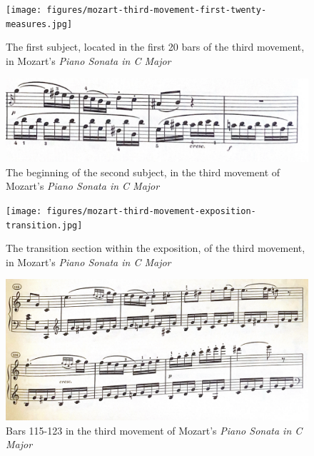 \begin{figure}
  	\centering
  	\texttt{[image: figures/mozart-third-movement-first-twenty-measures.jpg]}
  	\caption[The first subject of the third movement, in Mozart's \textit{Piano Sonata in C Major}]{The first subject, located in the first 20 bars of the third movement, in Mozart's \textit{Piano Sonata in C Major}}
 	\label{fig:mozart-third-movement-first-twenty-measures}
\end{figure}

\begin{figure}
	\centering
	\includegraphics[width=\textwidth]{figures/mozart-third-movement-beginning-of-second-subject-exposition.jpg}
	\caption[Subject number two, in the third movement of Mozart's \textit{Piano Sonata in C Major}]{The beginning of the second subject, in the third movement of Mozart's \textit{Piano Sonata in C Major}}
	\label{fig:mozart-third-movement-beginning-of-second-subject-exposition}
\end{figure}



\begin{figure}
  	\centering
  	\texttt{[image: figures/mozart-third-movement-exposition-transition.jpg]}
  	\caption{The transition section within the exposition, of the third movement, in Mozart's \textit{Piano Sonata in C Major}}
  	\label{fig:mozart-third-movement-exposition-transition}
\end{figure}

\begin{figure}
	\centering
	\includegraphics[width=\textwidth]{figures/mozart-third-movement-bars-116-123.jpg}
	\caption{Bars 115-123 in the third movement of Mozart's \textit{Piano Sonata in C Major}}
	\label{fig:mozart-third-movement-bars-116-123}
\end{figure}

